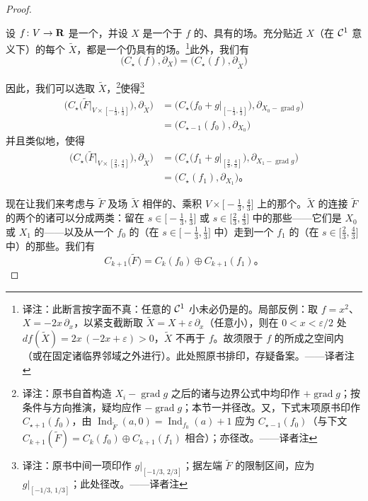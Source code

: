 \begin{proof}
\begin{proposition}\label{thm:perturbation-smale}
设 $f\colon V\to\mathbf{R}$ 是一个\trMorseFunction，并设 $X$ 是一个\trAdapted{}于 $f$ 的、具有\trSmaleCondition{}的\trPseudogradient{}场。充分贴近 $X$（在 $\mathcal{C}^1$ 意义下）的每个\trVectorField{} $\widetilde{X}$，都是一个仍具有\trSmaleCondition{}的\trAdapted{}\trPseudogradient{}场。\footnote{译注：此断言按字面不真：任意的 $\mathcal{C}^1$ 小\trPerturbation{}未必仍是\trAdapted{}的。局部反例：取 $f=x^2$、$X=-2x\,\partial_x$，以紧支截断取 $\widetilde{X}=X+\varepsilon\,\partial_x$（任意小），则在 $0<x<\varepsilon/2$ 处 $df(\widetilde{X})=2x\,(-2x+\varepsilon)>0$，$\widetilde{X}$ 不再\trAdapted{}于 $f$。故\trPerturbation{}须限于 $f$ 的\trAdapted{}\trPseudogradient{}所成之空间内（或在固定诸临界邻域之外进行）。此处照原书排印，存疑备案。——译者注}此外，我们有
\[
\bigl(C_{\star}(f),\partial_X\bigr)=\bigl(C_{\star}(f),\partial_{\widetilde{X}}\bigr)
\]
\noqed
\end{proposition}

因此，我们可以选取 $\widetilde{X}$，\footnote{译注：原书自首构造 $X_i-\operatorname{grad}g$ 之后的诸\trInterpolation{}与边界公式中均印作 $+\operatorname{grad}g$；按\trAdapted{}条件与\trTrajectory{}方向推演，疑均应作 $-\operatorname{grad}g$；本节一并径改。又，下式末项原书印作 $C_{\star+1}(f_0)$，由 $\operatorname{Ind}_{\widetilde{F}}(a,0)=\operatorname{Ind}_{f_0}(a)+1$ 应为 $C_{\star-1}(f_0)$（与下文 $C_{k+1}(\widetilde{F})=C_k(f_0)\oplus C_{k+1}(f_1)$ 相合）；亦径改。——译者注}使得\footnote{译注：原书中间一项印作 $g\bigl|_{[-1/3,\,2/3]}$；据左端 $\widetilde{F}$ 的限制区间，应为 $g\bigl|_{[-1/3,\,1/3]}$；此处径改。——译者注}
\[
\begin{aligned}
\bigl(C_{\star}\bigl(\widetilde{F}\bigr|_{V\times[-\frac{1}{3},\frac{1}{3}]}\bigr),\partial_{\widetilde{X}}\bigr)
  &=\bigl(C_{\star}\bigl(f_0+g\bigr|_{[-\frac{1}{3},\frac{1}{3}]}\bigr),\partial_{X_0-\operatorname{grad}g}\bigr)\\
  &=\bigl(C_{\star-1}(f_0),\partial_{X_0}\bigr)
\end{aligned}
\]
并且类似地，使得
\[
\begin{aligned}
\bigl(C_{\star}\bigl(\widetilde{F}\bigr|_{V\times[\frac{2}{3},\frac{4}{3}]}\bigr),\partial_{\widetilde{X}}\bigr)
  &=\bigl(C_{\star}\bigl(f_1+g\bigr|_{[\frac{2}{3},\frac{4}{3}]}\bigr),\partial_{X_1-\operatorname{grad}g}\bigr)\\
  &=\bigl(C_{\star}(f_1),\partial_{X_1}\bigr)\text{。}
\end{aligned}
\]

现在让我们来考虑与\trMorseFunction{} $\widetilde{F}$ 及场 $\widetilde{X}$ 相伴的、乘积 $V\times\bigl[-\tfrac{1}{3},\tfrac{4}{3}\bigr]$ 上的那个\trComplex。$\widetilde{X}$ 的连接 $\widetilde{F}$ 的两个\trCriticalPoint{}的诸\trTrajectory{}可以分成两类：留在\trSection{} $s\in\bigl[-\tfrac{1}{3},\tfrac{1}{3}\bigr]$ 或\trSection{} $s\in\bigl[\tfrac{2}{3},\tfrac{4}{3}\bigr]$ 中的那些——它们是 $X_0$ 或 $X_1$ 的\trTrajectory——以及从一个 $f_0$ 的\trCriticalPoint{}（在\trSection{} $s\in\bigl[-\tfrac{1}{3},\tfrac{1}{3}\bigr]$ 中）走到一个 $f_1$ 的\trCriticalPoint{}（在\trSection{} $s\in\bigl[\tfrac{2}{3},\tfrac{4}{3}\bigr]$ 中）的那些。我们有
\[
C_{k+1}\bigl(\widetilde{F}\bigr)=C_k(f_0)\oplus C_{k+1}(f_1)\text{。}
\]


\end{proof}
